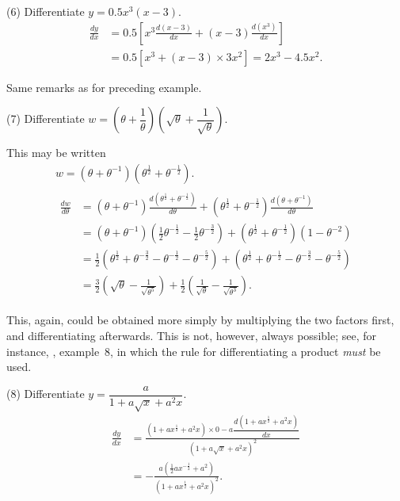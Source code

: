 \documentclass[12pt]{book}[2005/09/16]
\newcommand{\DPPageSep}[2]{\Pagelabel{#2}}
\newcommand{\Pagelabel}[1]
  {\phantomsection\label{#1}}
\newcommand{\Pageref}[2][p.]{%
  \ifthenelse{\not\equal{#1}{}}{%
    \hyperref[#2]{#1~\pageref{#2}}%
  }{%
    \hyperref[#2]{\pageref{#2}}%
  }%
}
\newcommand{\efrac}[2]{\frac{#1}{#2}}
\begin{document}
(6) Differentiate $y = 0.5 x^3(x-3)$.
\begin{align*}
\frac{dy}{dx}
  &= 0.5\left[x^3 \frac{d(x-3)}{dx} + (x-3) \frac{d(x^3)}{dx}\right] \\
  &= 0.5\left[x^3 + (x-3) × 3x^2\right] = 2x^3 - 4.5x^2.
\end{align*}

Same remarks as for preceding example.

(7) Differentiate $w = \left(\theta + \dfrac{1}{\theta}\right)
   \left(\sqrt{\theta} + \dfrac{1}{\sqrt{\theta}}\right)$.

This may be written
\begin{gather*}
w = (\theta + \theta^{-1})(\theta^{\efrac{1}{2}} + \theta^{-\efrac{1}{2}}). \\
\begin{aligned}
\frac{dw}{d\theta}
  &= (\theta + \theta^{-1})
     \frac{d(\theta^{\efrac{1}{2}} + \theta^{-\efrac{1}{2}})}{d\theta}
   + (\theta^{\efrac{1}{2}} + \theta^{-\efrac{1}{2}})
     \frac{d(\theta+\theta^{-1})}{d\theta} \\
%
  &= (\theta + \theta^{-1})(\tfrac{1}{2}\theta^{-\efrac{1}{2}}
                          - \tfrac{1}{2}\theta^{-\efrac{3}{2}})
   + (\theta^{\efrac{1}{2}} + \theta^{-\efrac{1}{2}})(1 - \theta^{-2}) \\
%
  &= \tfrac{1}{2}(\theta^{ \efrac{1}{2}} + \theta^{-\efrac{3}{2}}
                - \theta^{-\efrac{1}{2}} - \theta^{-\efrac{5}{2}})
   + (\theta^{ \efrac{1}{2}} + \theta^{-\efrac{1}{2}}
    - \theta^{-\efrac{3}{2}} - \theta^{-\efrac{5}{2}}) \\%
%
  &= \tfrac{3}{2} \left(\sqrt{\theta} - \frac{1}{\sqrt{\theta^5}}\right)
   + \tfrac{1}{2} \left(\frac{1}{\sqrt{\theta}} - \frac{1}{\sqrt{\theta^3}}\right).
\end{aligned}
\end{gather*}

This, again, could be obtained more simply by
multiplying the two factors first, and differentiating
afterwards. This is not, however, always possible;
see, for instance, \Pageref{example1}, example~8, in which the %
rule for differentiating a product \emph{must} be used.

(8) Differentiate $y =\dfrac{a}{1 + a\sqrt{x} + a^2x}$.
\begin{align*}
\frac{dy}{dx}
  &= \frac{(1 + ax^{\efrac{1}{2}} + a^2x) × 0 - a\dfrac{d(1 + ax^{\efrac{1}{2}} + a^2x)}{dx}}
          {(1 + a\sqrt{x} + a^2x)^2} \\
  &= - \frac{a(\frac{1}{2}ax^{-\efrac{1}{2}} + a^2)}
            {(1 + ax^{\efrac{1}{2}} + a^2x)^2}.
\end{align*}
\DPPageSep{056.png}{44}%
\end{document}
